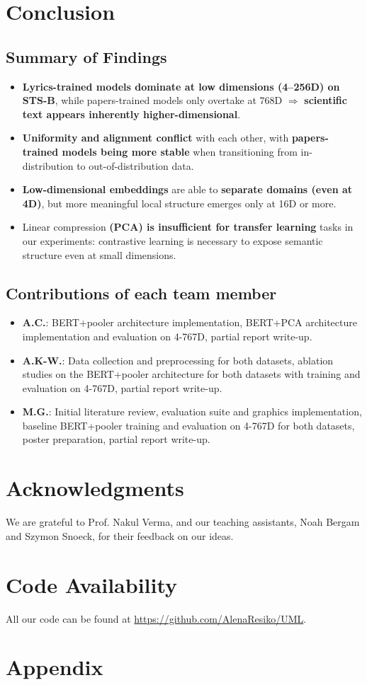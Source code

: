 \documentclass{article}
\begin{document}
\section{Conclusion}

\subsection{Summary of Findings}
\begin{itemize}
\item \textbf{Lyrics-trained models dominate at low dimensions (4–256D) on STS-B}, while
papers-trained models only overtake at 768D $\Rightarrow$ \textbf{scientific text appears
inherently higher-dimensional}.
\item \textbf{Uniformity and alignment conflict} with each other, with
\textbf{papers-trained models being more stable} when transitioning from in-distribution
to out-of-distribution data.
\item \textbf{Low-dimensional embeddings} are able to \textbf{separate domains (even at
4D)}, but more meaningful local structure emerges only at 16D or more.
\item Linear compression \textbf{(PCA) is insufficient for transfer learning} tasks in
our experiments: contrastive learning is necessary to expose semantic structure even at
small dimensions.
\end{itemize}

\subsection{Contributions of each team member}
\begin{itemize}
\item \textbf{A.C.}: BERT+pooler architecture implementation, BERT+PCA architecture
implementation and evaluation on 4-767D, partial report write-up.
\item \textbf{A.K-W.}: Data collection and preprocessing for both datasets, ablation
studies on the BERT+pooler architecture for both datasets with training and evaluation on
4-767D, partial report write-up.
\item \textbf{M.G.}: Initial literature review, evaluation suite and graphics
implementation, baseline BERT+pooler training and evaluation on 4-767D for both datasets,
poster preparation, partial report write-up.
\end{itemize}

\section*{Acknowledgments}
We are grateful to Prof. Nakul Verma, and our teaching assistants, Noah Bergam and Szymon
Snoeck, for their feedback on our ideas.

\section*{Code Availability}
All our code can be found at \hyperlink{Github}{https://github.com/AlenaResiko/UML}.




\raggedbottom

\section*{Appendix}

\raggedbottom
\end{document}
